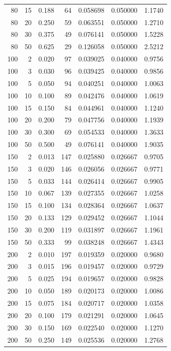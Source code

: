 \documentclass[
  letterpaper,
  DIV=11,
  numbers=noendperiod]{scrreprt}
\begin{document}
\begin{longtable}[]{@{}rrrrrrr@{}}
80 & 15 & 0.188 & 64 & 0.058698 & 0.050000 & 1.1740 \\
80 & 20 & 0.250 & 59 & 0.063551 & 0.050000 & 1.2710 \\
80 & 30 & 0.375 & 49 & 0.076141 & 0.050000 & 1.5228 \\
80 & 50 & 0.625 & 29 & 0.126058 & 0.050000 & 2.5212 \\
100 & 2 & 0.020 & 97 & 0.039025 & 0.040000 & 0.9756 \\
100 & 3 & 0.030 & 96 & 0.039425 & 0.040000 & 0.9856 \\
100 & 5 & 0.050 & 94 & 0.040251 & 0.040000 & 1.0063 \\
100 & 10 & 0.100 & 89 & 0.042476 & 0.040000 & 1.0619 \\
100 & 15 & 0.150 & 84 & 0.044961 & 0.040000 & 1.1240 \\
100 & 20 & 0.200 & 79 & 0.047756 & 0.040000 & 1.1939 \\
100 & 30 & 0.300 & 69 & 0.054533 & 0.040000 & 1.3633 \\
100 & 50 & 0.500 & 49 & 0.076141 & 0.040000 & 1.9035 \\
150 & 2 & 0.013 & 147 & 0.025880 & 0.026667 & 0.9705 \\
150 & 3 & 0.020 & 146 & 0.026056 & 0.026667 & 0.9771 \\
150 & 5 & 0.033 & 144 & 0.026414 & 0.026667 & 0.9905 \\
150 & 10 & 0.067 & 139 & 0.027355 & 0.026667 & 1.0258 \\
150 & 15 & 0.100 & 134 & 0.028364 & 0.026667 & 1.0637 \\
150 & 20 & 0.133 & 129 & 0.029452 & 0.026667 & 1.1044 \\
150 & 30 & 0.200 & 119 & 0.031897 & 0.026667 & 1.1961 \\
150 & 50 & 0.333 & 99 & 0.038248 & 0.026667 & 1.4343 \\
200 & 2 & 0.010 & 197 & 0.019359 & 0.020000 & 0.9680 \\
200 & 3 & 0.015 & 196 & 0.019457 & 0.020000 & 0.9729 \\
200 & 5 & 0.025 & 194 & 0.019657 & 0.020000 & 0.9828 \\
200 & 10 & 0.050 & 189 & 0.020173 & 0.020000 & 1.0086 \\
200 & 15 & 0.075 & 184 & 0.020717 & 0.020000 & 1.0358 \\
200 & 20 & 0.100 & 179 & 0.021291 & 0.020000 & 1.0645 \\
200 & 30 & 0.150 & 169 & 0.022540 & 0.020000 & 1.1270 \\
200 & 50 & 0.250 & 149 & 0.025536 & 0.020000 & 1.2768 \\

\end{longtable}
\end{document}
